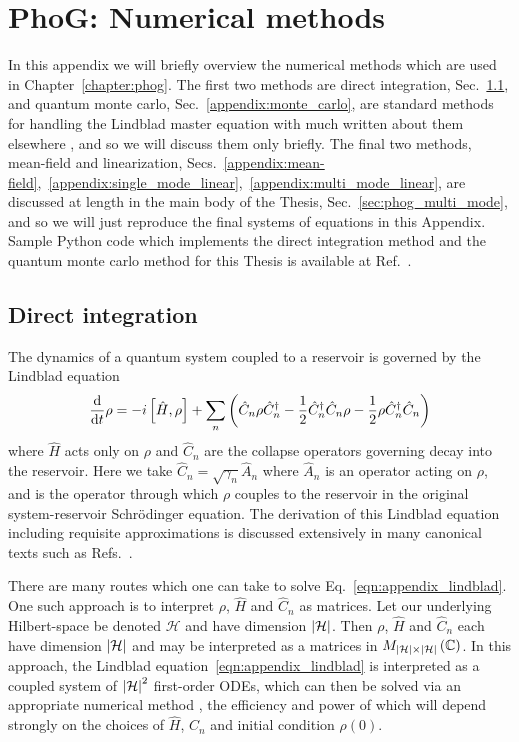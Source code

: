 \chapter{PhoG: Numerical methods}\label{appendix:phog_numerical_methods}

In this appendix we will briefly overview the numerical methods which are used in Chapter~\ref{chapter:phog}. The first two methods are direct integration, Sec.~\ref{appendix:direct_integration}, and quantum monte carlo, Sec.~\ref{appendix:monte_carlo}, are standard methods for handling the Lindblad master equation with much written about them elsewhere , and so we will discuss them only briefly. The final two methods, mean-field and linearization, Secs.~\ref{appendix:mean-field},~\ref{appendix:single_mode_linear},~\ref{appendix:multi_mode_linear}, are discussed at length in the main body of the Thesis, Sec.~\ref{sec:phog_multi_mode}, and so we will just reproduce the final systems of equations in this Appendix. Sample Python code which implements the direct integration method and the quantum monte carlo method for this Thesis is available at Ref.~\cite{deposited_code}.

\section{Direct integration}\label{appendix:direct_integration}

The dynamics of a quantum system coupled to a reservoir is governed by the Lindblad equation
\begin{equation}\label{eqn:appendix_lindblad}
\frac{\mathrm{d}}{\mathrm{d}t} \rho = - i \left[ \hat{H}, \rho \right] + \sum_n \left(\hat{C}_n \rho \hat{C}_n^\dagger - \frac{1}{2} \hat{C}_n^\dagger \hat{C}_n \rho - \frac{1}{2} \rho \hat{C}_n^\dagger \hat{C}_n \right)
\end{equation}
where $\hat{H}$ acts only on $\rho$ and $\hat{C}_n$ are the collapse operators governing decay into the reservoir. Here we take $\hat{C}_n = \sqrt{\gamma_n} \hat{A}_n$ where $\hat{A}_n$ is an operator acting on $\rho$, and is the operator through which $\rho$ couples to the reservoir in the original system-reservoir Schr{\"o}dinger equation. The derivation of this Lindblad equation including requisite approximations is discussed extensively in many canonical texts such as Refs.~\cite{Breuer2002, Carmichael1999}. 

There are many routes which one can take to solve Eq.~\ref{eqn:appendix_lindblad}. One such approach is to interpret $\rho$, $\hat{H}$ and $\hat{C}_n$ as matrices. Let our underlying Hilbert-space be denoted $\mathcal{H}$ and have dimension $\left|\mathcal{H}\right|$. Then $\rho$, $\hat{H}$ and $\hat{C}_n$ each have dimension $\left|\mathcal{H}\right|$ and may be interpreted as a matrices in $M_{\left|\mathcal{H}\right| \times \left|\mathcal{H}\right|}\left(\mathbb{C}\right)$. In this approach, the Lindblad equation~\ref{eqn:appendix_lindblad} is interpreted as a coupled system of $\left|\mathcal{H}\right|^2$ first-order ODEs, which can then be solved via an appropriate numerical method \cite{Corless2013}, the efficiency and power of which will depend strongly on the choices of $\hat{H}$, $\hat{C}_n$ and initial condition $\rho\left(0\right)$.

